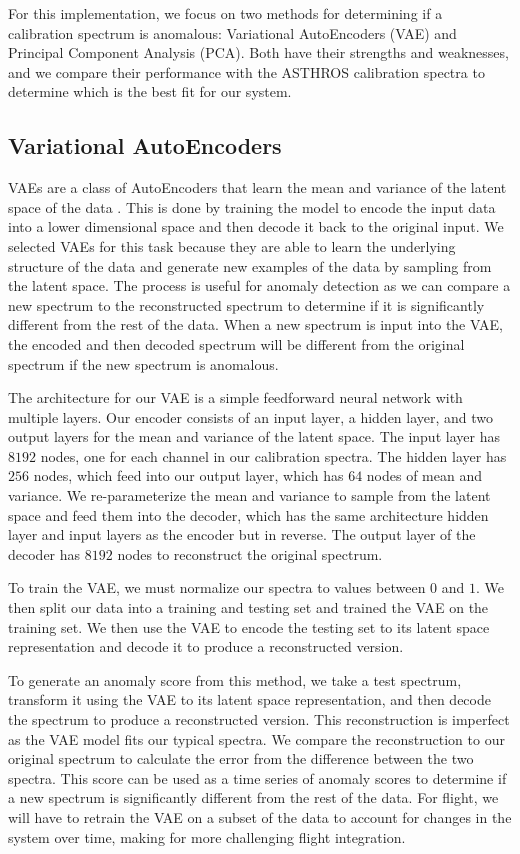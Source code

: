 For this implementation, we focus on two methods for determining if a calibration spectrum is anomalous: Variational AutoEncoders (VAE) and Principal Component Analysis (PCA).
Both have their strengths and weaknesses, and we compare their performance with the ASTHROS calibration spectra to determine which is the best fit for our system.

\subsection{Variational AutoEncoders}
VAEs are a class of AutoEncoders that learn the mean and variance of the latent space of the data \parencite{kingma2013auto}.
This is done by training the model to encode the input data into a lower dimensional space and then decode it back to the original input.
We selected VAEs for this task because they are able to learn the underlying structure of the data and generate new examples of the data by sampling from the latent space.
The process is useful for anomaly detection as we can compare a new spectrum to the reconstructed spectrum to determine if it is significantly different from the rest of the data.
When a new spectrum is input into the VAE, the encoded and then decoded spectrum will be different from the original spectrum if the new spectrum is anomalous.

The architecture for our VAE is a simple feedforward neural network with multiple layers.
Our encoder consists of an input layer, a hidden layer, and two output layers for the mean and variance of the latent space.
The input layer has $8192$ nodes, one for each channel in our calibration spectra.
The hidden layer has $256$ nodes, which feed into our output layer, which has $64$ nodes of mean and variance.
We re-parameterize the mean and variance to sample from the latent space and feed them into the decoder, which has the same architecture hidden layer and input layers as the encoder but in reverse.
The output layer of the decoder has $8192$ nodes to reconstruct the original spectrum.

To train the VAE, we must normalize our spectra to values between $0$ and $1$.
We then split our data into a training and testing set and trained the VAE on the training set.
We then use the VAE to encode the testing set to its latent space representation and decode it to produce a reconstructed version.

To generate an anomaly score from this method, we take a test spectrum, transform it using the VAE to its latent space representation, and then decode the spectrum to produce a reconstructed version.
This reconstruction is imperfect as the VAE model fits our typical spectra.
We compare the reconstruction to our original spectrum to calculate the error from the difference between the two spectra.
This score can be used as a time series of anomaly scores to determine if a new spectrum is significantly different from the rest of the data. 
For flight, we will have to retrain the VAE on a subset of the data to account for changes in the system over time, making for more challenging flight integration.

